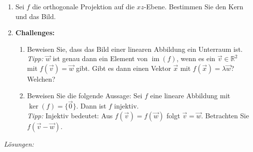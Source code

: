 \begin{ueb}
\begin{enumerate}
  \item Sei \( f \) die orthogonale Projektion auf die \( xz \)-Ebene.  
  Bestimmen Sie den Kern und das Bild.

  \item \textbf{Challenges:}
  \begin{enumerate}
    \item Beweisen Sie, dass das Bild einer linearen Abbildung ein Unterraum ist.\\
    \emph{Tipp:} \( \vec{w} \) ist genau dann ein Element von \( \operatorname{im}(f) \), wenn es ein  
    \( \vec{v} \in \mathbb{R}^2 \) mit \( f(\vec{v}) = \vec{w} \) gibt. Gibt es dann einen Vektor  
    \( \vec{x} \) mit \( f(\vec{x}) = \lambda \vec{w} \)? Welchen?

    \item Beweisen Sie die folgende Aussage:  
    Sei \( f \) eine lineare Abbildung mit \( \ker(f) = \{ \vec{0} \} \).  
    Dann ist \( f \) injektiv.\\
    \emph{Tipp:} Injektiv bedeutet: Aus \( f(\vec{v}) = f(\vec{w}) \) folgt \( \vec{v} = \vec{w} \).  
    Betrachten Sie \( f(\vec{v} - \vec{w}) \).
  \end{enumerate}
\end{enumerate}

\end{ueb}
\clearpage
\emph{Lösungen:}
